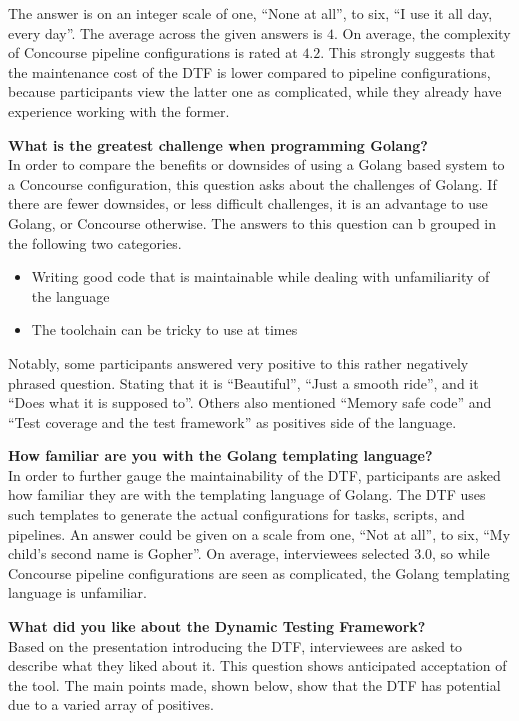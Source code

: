 The answer is on an integer scale of one, ``None at all'', to six, ``I use it all day, every day''.
The average across the given answers is $4$.
On average, the complexity of Concourse pipeline configurations is rated at $4.2$.
This strongly suggests that the maintenance cost of the DTF is lower compared to pipeline configurations, because participants view the latter one as complicated, while they already have experience working with the former.

\pagebreak

\textbf{What is the greatest challenge when programming Golang?}\\
In order to compare the benefits or downsides of using a Golang based system to a Concourse configuration, this question asks about the challenges of Golang.
If there are fewer downsides, or less difficult challenges, it is an advantage to use Golang, or Concourse otherwise.
The answers to this question can b grouped in the following two categories.

\begin{itemize}
    \item Writing good code that is maintainable while dealing with unfamiliarity of the language
    \item The toolchain can be tricky to use at times
\end{itemize}

Notably, some participants answered very positive to this rather negatively phrased question.
Stating that it is ``Beautiful'', ``Just a smooth ride'', and it ``Does what it is supposed to''.
Others also mentioned ``Memory safe code'' and ``Test coverage and the test framework'' as positives side of the language.

\textbf{How familiar are you with the Golang templating language?}\\
In order to further gauge the maintainability of the DTF, participants are asked how familiar they are with the templating language of Golang.
The DTF uses such templates to generate the actual configurations for tasks, scripts, and pipelines.
An answer could be given on a scale from one, ``Not at all'', to six, ``My child's second name is Gopher''.
On average, interviewees selected $3.0$, so while Concourse pipeline configurations are seen as complicated, the Golang templating language is unfamiliar.

\textbf{What did you like about the Dynamic Testing Framework?}\\
Based on the presentation introducing the DTF, interviewees are asked to describe what they liked about it.
This question shows anticipated acceptation of the tool.
The main points made, shown below, show that the DTF has potential due to a varied array of positives.

